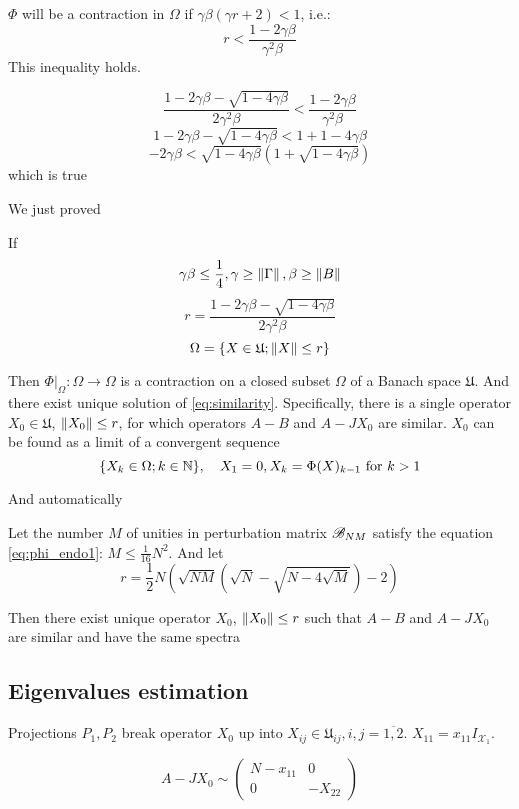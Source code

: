 \documentclass{article}
\begin{document}
\( \Phi \) will be a contraction in \( \Omega \) if \( \gamma\beta(\gamma r + 2) < 1 \), i.e.:
\[r < \frac{1-2\gamma\beta}{\gamma^2\beta}\]
This inequality holds.
\begin{TRIVIA}
        \[\frac{1-2\gamma\beta-\sqrt{1-4\gamma\beta}}{2\gamma^2\beta} < \frac{1-2\gamma\beta}{\gamma^2\beta}\]
        \[1-2\gamma\beta-\sqrt{1-4\gamma\beta} < 1+1-4\gamma\beta\]
        \[-2\gamma\beta<\sqrt{1-4\gamma\beta}\left(1+\sqrt{1-4\gamma\beta}\right)\]
        which is true
\end{TRIVIA}

We just proved
\begin{lemma}
    If
    \[\gamma\beta\leq\frac14, \gamma\geq\left\|{\Gamma}\right\|, \beta\geq\left\|{B}\right\|\]
    \[r = \frac{1 - 2\gamma\beta - \sqrt{1-4\gamma\beta}}{2 \gamma^2 \beta}\]
    \[\Omega = \{ X\in\mathfrak U; \left\|{X}\right\| \leq r \}\]

    Then
    \( \Phi|_{\Omega}:\Omega\to\Omega \) is a contraction on a closed subset \( \Omega \) of a Banach space \( \mathfrak U \).
    And there exist unique solution of \eqref{eq:similarity}.
    Specifically, there is a single operator \( X_0\in\mathfrak U \), \( \left\|{X_0}\right\| \leq r \),
    for which operators \( A-B \) and \( A-JX_0 \) are similar.
    \( X_0 \) can be found as a limit of a convergent sequence
    \[\{X_k\in\Omega; k\in\mathbb{N}\}, \quad X_1 = 0, X_k = \Phi(X)_{k-1} \text{ for } k>1\]
\end{lemma}
And automatically
\begin{thm}
    Let the number \( M \) of unities in perturbation matrix \( \mathscr{B}_{{N}{M}} \)
    satisfy the equation \eqref{eq:phi_endo1}: \( M \leq \frac{1}{16} N^2 \).
    And let
    \[ r = \frac12 N
        \left(
        \sqrt{NM}(\sqrt{N} - \sqrt{N-4\sqrt{M}}) - 2
        \right) \]

    Then there exist unique operator \( X_0 \), \( \left\|{X_0}\right\| \leq r \) such that \( A - B \) and \( A - J X_0 \) are similar
    and have the same spectra
\end{thm}

\subsection{Eigenvalues estimation}
Projections \( P_1, P_2 \) break operator \( X_0 \) up into \( X_{ij}\in\mathfrak U_{ij}, i,j=\overline{1,2} \).
\( X_{11} = x_{11} I_{\mathcal X_1} \).

\[
    A-JX_0 \sim
    \left(
\begin{array}{c|c}
    N-x_{11} & 0 \\
    \hline
    0        & -X_{22}
\end{array}
\right)
\]
\end{document}
